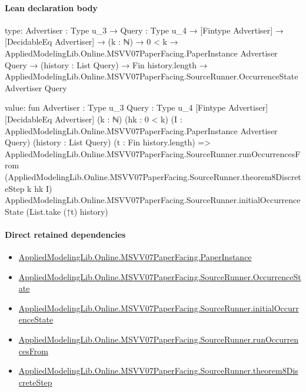 \documentclass[10pt]{article}
\begin{document}
\paragraph{Lean declaration body}
\begin{ReviewVerbatim}
type:
{Advertiser : Type u_3} →
  {Query : Type u_4} →
    [Fintype Advertiser] →
      [DecidableEq Advertiser] →
        (k : ℕ) →
          0 < k →
            AppliedModelingLib.Online.MSVV07PaperFacing.PaperInstance Advertiser Query →
              (history : List Query) →
                Fin history.length →
                  AppliedModelingLib.Online.MSVV07PaperFacing.SourceRunner.OccurrenceState Advertiser Query

value:
fun {Advertiser : Type u_3} {Query : Type u_4} [Fintype Advertiser] [DecidableEq Advertiser] (k : ℕ) (hk : 0 < k)
    (I : AppliedModelingLib.Online.MSVV07PaperFacing.PaperInstance Advertiser Query) (history : List Query)
    (t : Fin history.length) =>
  AppliedModelingLib.Online.MSVV07PaperFacing.SourceRunner.runOccurrencesFrom
    (AppliedModelingLib.Online.MSVV07PaperFacing.SourceRunner.theorem8DiscreteStep k hk I)
    AppliedModelingLib.Online.MSVV07PaperFacing.SourceRunner.initialOccurrenceState (List.take (↑t) history)
\end{ReviewVerbatim}

\paragraph{Direct retained dependencies}
\begin{itemize}\raggedright
\item \hyperlink{governing-declaration-11907576ec71eeb5}{Applied\allowbreak{}Modeling\allowbreak{}Lib.\allowbreak{}Online.\allowbreak{}MSVV07\allowbreak{}Paper\allowbreak{}Facing.\allowbreak{}Paper\allowbreak{}Instance}
\item \hyperlink{governing-declaration-2eff7815f49c1d41}{Applied\allowbreak{}Modeling\allowbreak{}Lib.\allowbreak{}Online.\allowbreak{}MSVV07\allowbreak{}Paper\allowbreak{}Facing.\allowbreak{}Source\allowbreak{}Runner.\allowbreak{}Occurrence\allowbreak{}State}
\item \hyperlink{governing-declaration-e173eeda3926c5ec}{Applied\allowbreak{}Modeling\allowbreak{}Lib.\allowbreak{}Online.\allowbreak{}MSVV07\allowbreak{}Paper\allowbreak{}Facing.\allowbreak{}Source\allowbreak{}Runner.\allowbreak{}initial\allowbreak{}Occurrence\allowbreak{}State}
\item \hyperlink{governing-declaration-7f435ae50ae781b1}{Applied\allowbreak{}Modeling\allowbreak{}Lib.\allowbreak{}Online.\allowbreak{}MSVV07\allowbreak{}Paper\allowbreak{}Facing.\allowbreak{}Source\allowbreak{}Runner.\allowbreak{}run\allowbreak{}Occurrences\allowbreak{}From}
\item \hyperlink{governing-declaration-90bf0eb712bf5ca1}{Applied\allowbreak{}Modeling\allowbreak{}Lib.\allowbreak{}Online.\allowbreak{}MSVV07\allowbreak{}Paper\allowbreak{}Facing.\allowbreak{}Source\allowbreak{}Runner.\allowbreak{}theorem8\allowbreak{}Discrete\allowbreak{}Step}
\end{itemize}
\hypertarget{governing-declaration-7cc47e6ea353e743}{}
\end{document}
